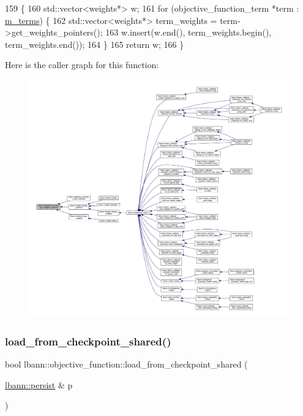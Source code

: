 \begin{DoxyCode}
159                                                                    \{
160   std::vector<weights*> w;
161   \textcolor{keywordflow}{for} (objective\_function\_term *term : \hyperlink{classlbann_1_1objective__function_aea9c1f90ba9af1b1330efa2ba6adb5e2}{m\_terms}) \{
162     std::vector<weights*> term\_weights = term->get\_weights\_pointers();
163     w.insert(w.end(), term\_weights.begin(), term\_weights.end());
164   \}
165   \textcolor{keywordflow}{return} w;
166 \}
\end{DoxyCode}
Here is the caller graph for this function\+:\nopagebreak
\begin{figure}[H]
\begin{center}
\leavevmode
\includegraphics[width=350pt]{classlbann_1_1objective__function_a8e37f76e42f6f341ea3592001b3794e5_icgraph}
\end{center}
\end{figure}
\mbox{\label{classlbann_1_1objective__function_a82fec97efbb8c4f68a674d42e0f2faa4}} 
\subsubsection{\texorpdfstring{load\+\_\+from\+\_\+checkpoint\+\_\+shared()}{load\_from\_checkpoint\_shared()}}
{\footnotesize\ttfamily bool lbann\+::objective\+\_\+function\+::load\+\_\+from\+\_\+checkpoint\+\_\+shared (\begin{DoxyParamCaption}\item[{\hyperlink{classlbann_1_1persist}{lbann\+::persist} \&}]{p }\end{DoxyParamCaption})}




